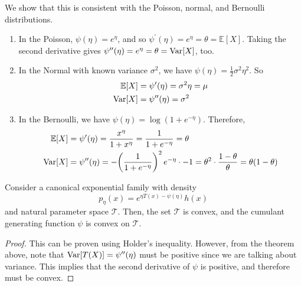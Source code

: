     \begin{example}
    We show that this is consistent with the Poisson, normal, and Bernoulli distributions. 
    \begin{enumerate}
        \item In the Poisson, $\psi(\eta) = e^{\eta}$, and so $\psi^\prime(\eta) = e^\eta = \theta = \mathbb{E}[X]$. Taking the second derivative gives $\psi^{\prime\prime}(\eta) = e^\eta = \theta = \Var[X]$, too. \
        
        \item In the Normal with known variance $\sigma^2$, we have $\psi(\eta) = \frac{1}{2} \sigma^2 \eta^2$. So 
        \begin{align*}
            \mathbb{E}[X] & = \psi^\prime (\eta) = \sigma^2 \eta = \mu \\
            \Var[X] & = \psi^{\prime\prime} (\eta) = \sigma^2
        \end{align*}

        \item In the Bernoulli, we have $\psi(\eta) = \log(1 + e^{-\eta})$. Therefore, 
        \begin{align*}
            \mathbb{E}[X] & = \psi^\prime (\eta) = \frac{x^\eta}{1 + x^{\eta}} = \frac{1}{1 + e^{-\eta}} = \theta \\
            \Var[X] & = \psi^{\prime\prime} (\eta) = -\bigg(\frac{1}{1 + e^{-\eta}}\bigg)^2 \, e^{-\eta} \cdot -1 = \theta^2 \cdot \frac{1 - \theta}{\theta} = \theta (1 - \theta) 
        \end{align*}
    \end{enumerate}
    \end{example}

    \begin{theorem}[Convexity]
    Consider a canonical exponential family with density 
    \[p_\eta (x) = e^{\eta T(x) - \psi(\eta)} h(x)\]
    and natural parameter space $\mathcal{T}$. Then, the set $\mathcal{T}$ is convex, and the cumulant generating function $\psi$ is convex on $\mathcal{T}$. 
    \end{theorem}
    \begin{proof}
    This can be proven using Holder's inequality. However, from the theorem above, note that $\Var[T(X)] = \psi^{\prime\prime}(\eta)$ must be positive since we are talking about variance. This implies that the second derivative of $\psi$ is positive, and therefore must be convex. 
    \end{proof}

